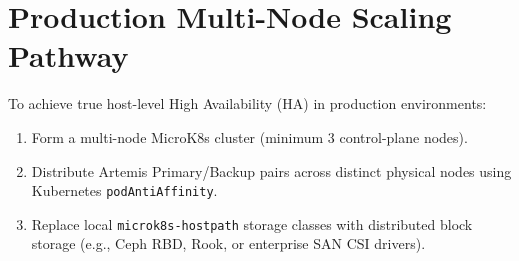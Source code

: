 \section{Production Multi-Node Scaling Pathway}

To achieve true host-level High Availability (HA) in production environments:
\begin{enumerate}
    \item Form a multi-node MicroK8s cluster (minimum 3 control-plane nodes).
    \item Distribute Artemis Primary/Backup pairs across distinct physical nodes using Kubernetes \texttt{podAntiAffinity}.
    \item Replace local \texttt{microk8s-hostpath} storage classes with distributed block storage (e.g., Ceph RBD, Rook, or enterprise SAN CSI drivers).
\end{enumerate}

\newpage
